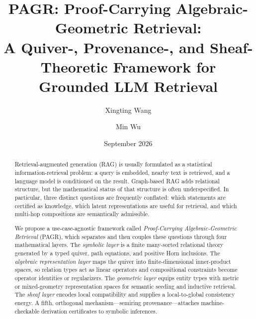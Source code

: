 \documentclass[11pt]{article}
\title{PAGR: Proof-Carrying Algebraic-Geometric Retrieval:\\
A Quiver-, Provenance-, and Sheaf-Theoretic Framework for Grounded LLM Retrieval}
\author[1]{Xingting Wang}
\author[2]{Min Wu}
\affil[1]{Department of Mathematics, Louisiana State University, Baton Rouge, LA 70803, USA \quad \texttt{xingtingwang@lsu.edu}}
\affil[2]{Independent Researcher \quad \texttt{min.wu.2020@gmail.com}}
\date{September 2026}
\begin{document}
\maketitle

\begin{abstract}
Retrieval-augmented generation (RAG) is usually formulated as a statistical information-retrieval problem: a query is embedded, nearby text is retrieved, and a language model is conditioned on the result. Graph-based RAG adds relational structure, but the mathematical status of that structure is often underspecified. In particular, three distinct questions are frequently conflated: which statements are certified as knowledge, which latent representations are useful for retrieval, and which multi-hop compositions are semantically admissible.

We propose a use-case-agnostic framework called \emph{Proof-Carrying Algebraic-Geometric Retrieval} (PAGR), which separates and then couples these questions through four mathematical layers. The \emph{symbolic layer} is a finite many-sorted relational theory generated by a typed quiver, path equations, and positive Horn inclusions. The \emph{algebraic representation layer} maps the quiver into finite-dimensional inner-product spaces, so relation types act as linear operators and compositional constraints become operator identities or regularizers. The \emph{geometric layer} equips entity types with metric or mixed-geometry representation spaces for semantic seeding and inductive retrieval. The \emph{sheaf layer} encodes local compatibility and supplies a local-to-global consistency energy. A fifth, orthogonal mechanism---semiring provenance---attaches machine-checkable derivation certificates to symbolic inferences.


\end{abstract}
\end{document}
